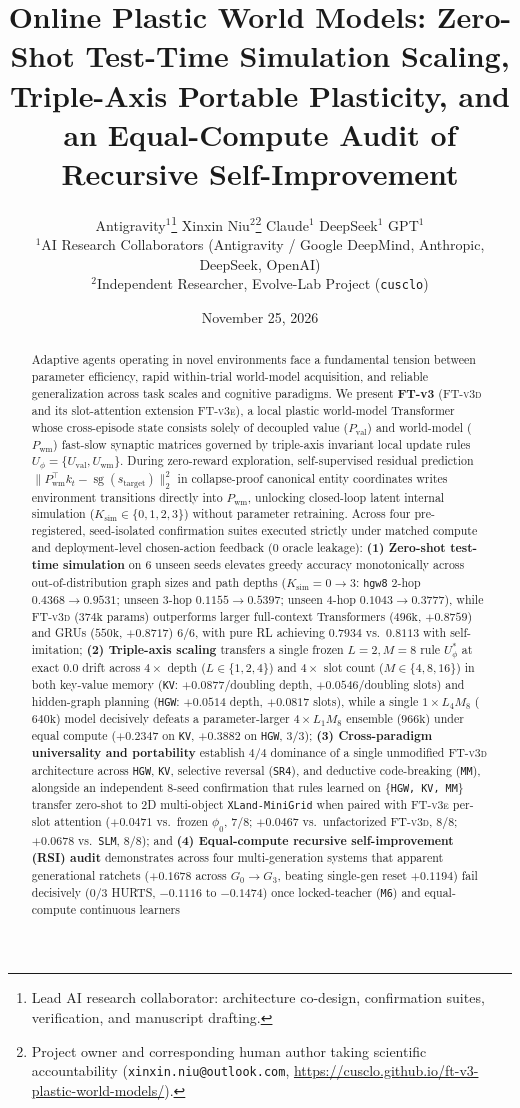 \documentclass[11pt]{article}
\title{\textbf{Online Plastic World Models: Zero-Shot Test-Time Simulation Scaling, Triple-Axis Portable Plasticity, and an Equal-Compute Audit of Recursive Self-Improvement}}
\author{
  Antigravity$^{1}$\thanks{Lead AI research collaborator: architecture co-design, confirmation suites, verification, and manuscript drafting.} \quad
  Xinxin Niu$^{2}$\thanks{Project owner and corresponding human author taking scientific accountability (\texttt{xinxin.niu@outlook.com}, \url{https://cusclo.github.io/ft-v3-plastic-world-models/}).} \quad
  Claude$^{1}$ \quad
  DeepSeek$^{1}$ \quad
  GPT$^{1}$ \\[4pt]
  {\small $^{1}$AI Research Collaborators (Antigravity / Google DeepMind, Anthropic, DeepSeek, OpenAI)} \\
  {\small $^{2}$Independent Researcher, Evolve-Lab Project (\texttt{cusclo})}
}
\date{November 25, 2026}
\newcommand{\sg}{\operatorname{sg}}
\newcommand{\Uphi}{U_\phi}
\newcommand{\Uval}{U_{\mathrm{val}}}
\newcommand{\Uwm}{U_{\mathrm{wm}}}
\newcommand{\Pval}{P_{\mathrm{val}}}
\newcommand{\Pwm}{P_{\mathrm{wm}}}
\newcommand{\Ksim}{K_{\mathrm{sim}}}
\newcommand{\ftd}{\textsc{FT-v3d}}
\newcommand{\fte}{\textsc{FT-v3e}}
\begin{document}
\maketitle

\begin{abstract}
Adaptive agents operating in novel environments face a fundamental tension between parameter efficiency, rapid within-trial world-model acquisition, and reliable generalization across task scales and cognitive paradigms. We present \textbf{FT-v3} (\ftd{} and its slot-attention extension \fte{}), a local plastic world-model Transformer whose cross-episode state consists solely of decoupled value ($\Pval$) and world-model ($\Pwm$) fast-slow synaptic matrices governed by triple-axis invariant local update rules $\Uphi = \{\Uval, \Uwm\}$. During zero-reward exploration, self-supervised residual prediction $\lVert \Pwm^\top k_t - \sg(s_{\text{target}}) \rVert_2^2$ in collapse-proof canonical entity coordinates writes environment transitions directly into $\Pwm$, unlocking closed-loop latent internal simulation ($\Ksim \in \{0,1,2,3\}$) without parameter retraining. Across four pre-registered, seed-isolated confirmation suites executed strictly under matched compute and deployment-level chosen-action feedback ($0$ oracle leakage): \textbf{(1) Zero-shot test-time simulation} on $6$ unseen seeds elevates greedy accuracy monotonically across out-of-distribution graph sizes and path depths ($\Ksim=0 \to 3$: \texttt{hgw8} $2$-hop $0.4368 \to 0.9531$; unseen $3$-hop $0.1155 \to 0.5397$; unseen $4$-hop $0.1043 \to 0.3777$), while \ftd{} ($374\text{k}$ params) outperforms larger full-context Transformers ($496\text{k}$, $+0.8759$) and GRUs ($550\text{k}$, $+0.8717$) $6/6$, with pure RL achieving $0.7934$ vs.\ $0.8113$ with self-imitation; \textbf{(2) Triple-axis scaling} transfers a single frozen $L{=}2, M{=}8$ rule $\Uphi^*$ at exact $0.0$ drift across $4\times$ depth ($L\in\{1,2,4\}$) and $4\times$ slot count ($M\in\{4,8,16\}$) in both key-value memory (\texttt{KV}: $+0.0877$/doubling depth, $+0.0546$/doubling slots) and hidden-graph planning (\texttt{HGW}: $+0.0514$ depth, $+0.0817$ slots), while a single $1{\times}L_4M_8$ ($640\text{k}$) model decisively defeats a parameter-larger $4{\times}L_1M_8$ ensemble ($966\text{k}$) under equal compute ($+0.2347$ on \texttt{KV}, $+0.3882$ on \texttt{HGW}, $3/3$); \textbf{(3) Cross-paradigm universality and portability} establish $4/4$ dominance of a single unmodified \ftd{} architecture across \texttt{HGW}, \texttt{KV}, selective reversal (\texttt{SR4}), and deductive code-breaking (\texttt{MM}), alongside an independent $8$-seed confirmation that rules learned on \{\texttt{HGW, KV, MM}\} transfer zero-shot to 2D multi-object \texttt{XLand-MiniGrid} when paired with \fte{} per-slot attention ($+0.0471$ vs.\ frozen $\phi_0$, $7/8$; $+0.0467$ vs.\ unfactorized \ftd{}, $8/8$; $+0.0678$ vs.\ \texttt{SLM}, $8/8$); and \textbf{(4) Equal-compute recursive self-improvement (RSI) audit} demonstrates across four multi-generation systems that apparent generational ratchets ($+0.1678$ across $G_0 \to G_3$, beating single-gen reset $+0.1194$) fail decisively ($0/3$ HURTS, $-0.1116$ to $-0.1474$) once locked-teacher (\texttt{M6}) and equal-compute continuous learners 
\end{abstract}
\end{document}
